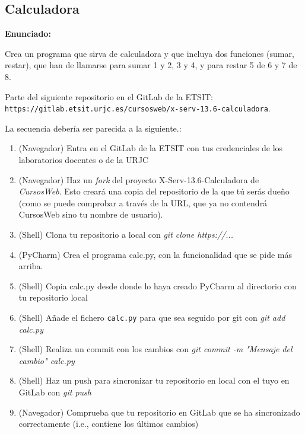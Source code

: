 \subsection{Calculadora}
\label{subsec:calculadora}

\textbf{Enunciado:}

Crea un programa que sirva de calculadora y que incluya dos funciones
(sumar, restar), que han de llamarse para sumar 1 y 2, 3 y 4, y para restar 5 de 6 y 7 de 8.


Parte del siguiente repositorio en el GitLab de la ETSIT: \\ \verb|https://gitlab.etsit.urjc.es/cursosweb/x-serv-13.6-calculadora|.

La secuencia debería ser parecida a la siguiente.:

\begin{enumerate}
  \item (Navegador) Entra en el GitLab de la ETSIT con tus credenciales de los laboratorios docentes o de la URJC
  \item (Navegador) Haz un \emph{fork} del proyecto X-Serv-13.6-Calculadora de \emph{CursosWeb}. Esto creará una copia del repositorio de la que tú serás dueño (como se puede comprobar a través de la URL, que ya no contendrá CursosWeb sino tu nombre de usuario).
  \item (Shell) Clona tu repositorio a local con \emph{git clone https://...}
  \item (PyCharm) Crea el programa calc.py, con la funcionalidad que se pide más arriba.
  \item (Shell) Copia calc.py desde donde lo haya creado PyCharm al directorio con tu repositorio local
  \item (Shell) Añade el fichero \texttt{calc.py} para que sea seguido por git con \emph{git add calc.py} 
  \item (Shell) Realiza un commit con los cambios con \emph{git commit -m "Mensaje del cambio" calc.py}
  \item (Shell) Haz un push para sincronizar tu repositorio en local con el tuyo en GitLab con \emph{git push}
  \item (Navegador) Comprueba que tu repositorio en GitLab que se ha sincronizado correctamente (i.e., contiene los últimos cambios)
\end{enumerate}


